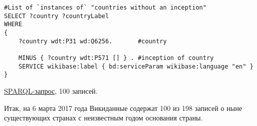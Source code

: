 \begin{lstlisting}[language=SPARQL]
#List of `instances of` "countries without an inception" 
SELECT ?country ?countryLabel 
WHERE
{
    ?country wdt:P31 wd:Q6256.       #country
    
    MINUS { ?country wdt:P571 [] } . #inception of country
    SERVICE wikibase:label { bd:serviceParam wikibase:language "en" }
}
\end{lstlisting}

\href{https://query.wikidata.org/#%23List%20of%20%60instances%20of%60%20%22countries%20without%20a%20inception%22%20%0ASELECT%20%3Fcountry%20%3FcountryLabel%20%0AWHERE%0A%7B%0A%20%20%20%20%3Fcountry%20wdt%3AP31%20wd%3AQ6256.%20%23country%0A%20%20%20%20%0A%20%20%20%20MINUS%20%7B%20%3Fcountry%20wdt%3AP571%20%5B%5D%20%7D%20.%20%23inception%20of%20country%0A%20%20%20%20SERVICE%20wikibase%3Alabel%20%7B%20bd%3AserviceParam%20wikibase%3Alanguage%20%22en%22%20%7D%0A%7D%0A%0A}{SPARQL-запрос}, 100 записей.

Итак, на 6 марта 2017 года Викиданные содержат 100 из 198 записей о ныне существующих странах с неизвестным годом основания страны.